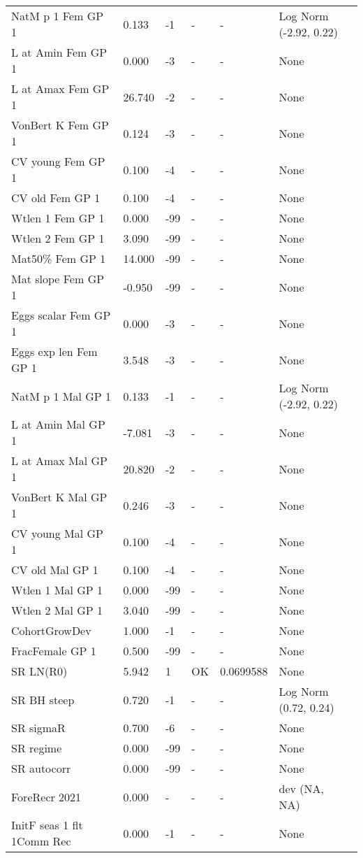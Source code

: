 \documentclass[11pt,
  english,
  a4paper,
]{article}
\begin{document}
\begin{landscape}
\begin{longtable}[t]{>{\raggedright\arraybackslash}p{6cm}lllll>{\raggedright\arraybackslash}p{4cm}}
\endfoot
\bottomrule
\endlastfoot
NatM p 1 Fem GP 1 & 0.133 & -1 & - & - & Log Norm (-2.92, 0.22)\\
L at Amin Fem GP 1 & 0.000 & -3 & - & - & None\\
L at Amax Fem GP 1 & 26.740 & -2 & - & - & None\\
VonBert K Fem GP 1 & 0.124 & -3 & - & - & None\\
CV young Fem GP 1 & 0.100 & -4 & - & - & None\\
CV old Fem GP 1 & 0.100 & -4 & - & - & None\\
Wtlen 1 Fem GP 1 & 0.000 & -99 & - & - & None\\
Wtlen 2 Fem GP 1 & 3.090 & -99 & - & - & None\\
Mat50\% Fem GP 1 & 14.000 & -99 & - & - & None\\
Mat slope Fem GP 1 & -0.950 & -99 & - & - & None\\
Eggs scalar Fem GP 1 & 0.000 & -3 & - & - & None\\
Eggs exp len Fem GP 1 & 3.548 & -3 & - & - & None\\
NatM p 1 Mal GP 1 & 0.133 & -1 & - & - & Log Norm (-2.92, 0.22)\\
L at Amin Mal GP 1 & -7.081 & -3 & - & - & None\\
L at Amax Mal GP 1 & 20.820 & -2 & - & - & None\\
VonBert K Mal GP 1 & 0.246 & -3 & - & - & None\\
CV young Mal GP 1 & 0.100 & -4 & - & - & None\\
CV old Mal GP 1 & 0.100 & -4 & - & - & None\\
Wtlen 1 Mal GP 1 & 0.000 & -99 & - & - & None\\
Wtlen 2 Mal GP 1 & 3.040 & -99 & - & - & None\\
CohortGrowDev & 1.000 & -1 & - & - & None\\
FracFemale GP 1 & 0.500 & -99 & - & - & None\\
SR LN(R0) & 5.942 & 1 & OK & 0.0699588 & None\\
SR BH steep & 0.720 & -1 & - & - & Log Norm (0.72, 0.24)\\
SR sigmaR & 0.700 & -6 & - & - & None\\
SR regime & 0.000 & -99 & - & - & None\\
SR autocorr & 0.000 & -99 & - & - & None\\
ForeRecr 2021 & 0.000 & - & - & - & dev (NA, NA)\\
InitF seas 1 flt 1Comm Rec & 0.000 & -1 & - & - & None\\

\end{longtable}
\end{landscape}
\end{document}
